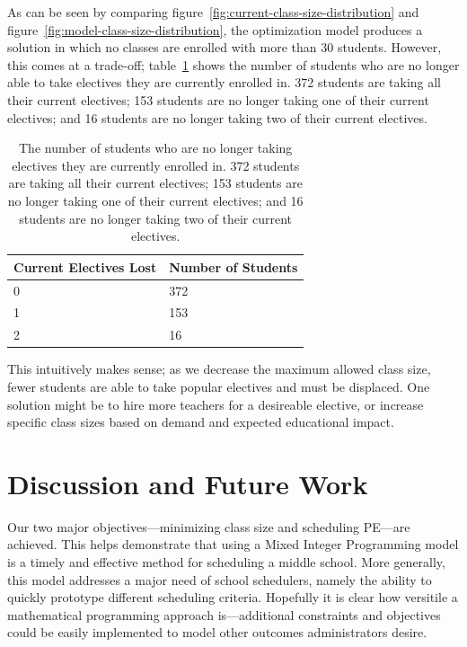 \documentclass[12pt]{article}
\begin{document}
As can be seen by comparing figure~\ref{fig:current-class-size-distribution} and figure~\ref{fig:model-class-size-distribution}, the optimization model produces a solution in which no classes are enrolled with more than 30 students. However, this comes at a trade-off; table~\ref{tab:num-electives-lost} shows the number of students who are no longer able to take electives they are currently enrolled in. 372 students are taking all their current electives; 153 students are no longer taking one of their current electives; and 16 students are no longer taking two of their current electives.

\begin{table}[]
\centering
\caption{The number of students who are no longer taking electives they are currently enrolled in. 372 students are taking all their current electives; 153 students are no longer taking one of their current electives; and 16 students are no longer taking two of their current electives.}
\label{tab:num-electives-lost}
\begin{tabular}{ll}
\hline
Current Electives Lost & Number of Students \\ \hline
0                      & 372                \\
1                      & 153                \\
2                      & 16                 \\ \hline
\end{tabular}
\end{table}

This intuitively makes sense; as we decrease the maximum allowed class size, fewer students are able to take popular electives and must be displaced. One solution might be to hire more teachers for a desireable elective, or increase specific class sizes based on demand and expected educational impact.

\section{Discussion and Future Work}

Our two major objectives---minimizing class size and scheduling PE---are achieved. This helps demonstrate that using a Mixed Integer Programming model is a timely and effective method for scheduling a middle school. More generally, this model addresses a major need of school schedulers, namely the ability to quickly prototype different scheduling criteria. Hopefully it is clear how versitile a mathematical programming approach is---additional constraints and objectives could be easily implemented to model other outcomes administrators desire.
\end{document}
